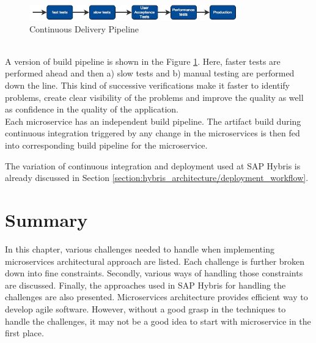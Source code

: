 \begin{enumerate}
\\
\begin{figure}[H]
\begin{center}
\includegraphics[width=0.8\textwidth]{figures/challenges_six_continuous_delivery}
\caption{Continuous Delivery Pipeline \cite{Newman:2015aa}}
\label{fig:challanges_of_microservices_architecture/deployment/continuous_delivery}
\end{center}
\end{figure}
\\
A version of build pipeline is shown in the Figure \ref{fig:challanges_of_microservices_architecture/deployment/continuous_delivery}. Here, faster tests are performed ahead and then a) slow tests and b) manual testing are performed down the line. This kind of successive verifications make it faster to identify problems, create clear visibility of the problems and improve the quality as well as confidence in the quality of the application.\\
Each microservice has an independent build pipeline. The artifact build during continuous integration triggered by any change in the microservices is then fed into corresponding build pipeline for the microservice. \cite{Newman:2015aa} \cite{Fowler:2013aa}
\end{enumerate}

\begin{shaded}
The variation of continuous integration and deployment used at SAP Hybris is already discussed in Section \ref{section:hybris_architecture/deployment_workflow}.
\end{shaded}

\section{Summary}\label{section:challanges_of_microservices_architecture/conclusion}
In this chapter, various challenges needed to handle when implementing microservices architectural approach are listed. Each challenge is further broken down into fine constraints. Secondly, various ways of handling those constraints are discussed. Finally, the approaches used in SAP Hybris for handling the challenges are also presented. Microservices architecture provides efficient way to develop agile software. However, without a good grasp in the techniques to handle the challenges, it may not be a good idea to start with microservice in the first place.













